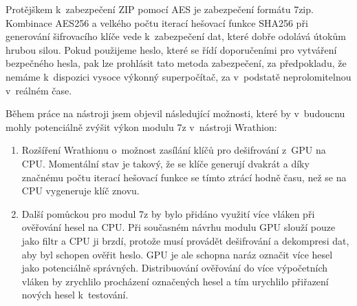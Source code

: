 Protějškem k~zabezpečení ZIP pomocí AES je zabezpečení formátu 7zip. Kombinace AES256 a velkého
počtu iterací hešovací funkce SHA256 při generování šifrovacího klíče vede k~zabezpečení dat, které
dobře odolává útokům hrubou silou. Pokud použijeme heslo, které se řídí doporučeními pro vytváření
bezpečného hesla, pak lze prohlásit tato metoda zabezpečení, za předpokladu, že nemáme k~dispozici
vysoce výkonný superpočítač, za v~podstatě neprolomitelnou v~reálném čase.

Během práce na nástroji jsem objevil následující možnosti, které by v~budoucnu mohly potenciálně
zvýšit výkon modulu 7z v~nástroji Wrathion:
\begin{enumerate}
   \item Rozšíření Wrathionu o~možnost zasílání klíčů pro dešifrování z~GPU na CPU. Momentální
       stav je takový, že se klíče generují dvakrát a díky značnému počtu iterací hešovací funkce
       se tímto ztrácí hodně času, než se na CPU vygeneruje klíč znovu.
    \item Další pomůckou pro modul 7z by bylo přidáno využití více vláken při ověřování hesel na
	CPU. Při současném návrhu modulu GPU slouží pouze jako filtr a CPU ji brzdí, protože musí
	provádět dešifrování a dekompresi dat, aby byl schopen ověřit heslo. GPU je ale schopna
	naráz označit více hesel jako potenciálně správných. Distribuování ověřování do
	více výpočetních vláken by zrychlilo procházení označených hesel a tím urychlilo
	přiřazení nových hesel k~testování.
\end{enumerate}


